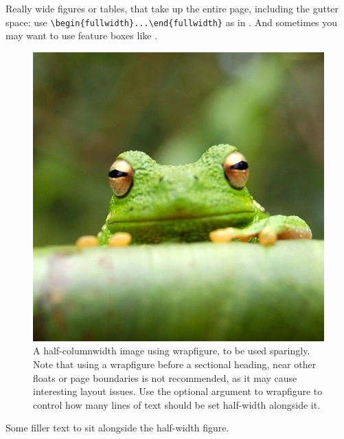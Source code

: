 \documentclass[9pt,lineno]{elife}
\begin{document}
Really wide figures or tables, that take up the entire page, including the gutter space: use \verb|\begin{fullwidth}...\end{fullwidth}| as in . And sometimes you may want to use feature boxes like .

\begin{figure}
\includegraphics[width=\hsize]{frog}
\caption{A half-columnwidth image using wrapfigure, to be used sparingly. Note that using a wrapfigure before a sectional heading, near other floats or page boundaries is not recommended, as it may cause interesting layout issues. Use the optional argument to wrapfigure to control how many lines of text should be set half-width alongside it.}
\label{fig:halfwidth}
\end{figure}

Some filler text to sit alongside the half-width figure. \lipsum[1-2]
\end{document}
